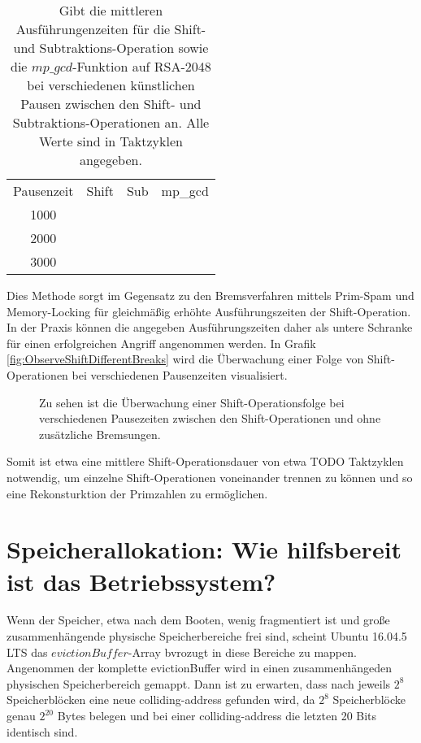 \begin{table}[h]
\caption{Gibt die mittleren Ausführungenzeiten für die Shift- und Subtraktions-Operation sowie die $mp\_gcd$-Funktion auf RSA-2048 bei verschiedenen künstlichen Pausen zwischen den Shift- und Subtraktions-Operationen an. Alle Werte sind in Taktzyklen angegeben.}
\label{tbl:ArtificialBreaksMeanExecutionTime}
\begin{tabular}{cccc}
Pausenzeit & Shift & Sub & mp\_gcd \\
1000       &       &     &         \\
2000       &       &     &         \\
3000       &       &     &        
\end{tabular}
\end{table}

Dies Methode sorgt im Gegensatz zu den Bremsverfahren mittels Prim-Spam und Memory-Locking für gleichmäßig erhöhte Ausführungszeiten der Shift-Operation.
In der Praxis können die angegeben Ausführungszeiten daher als untere Schranke für einen erfolgreichen Angriff angenommen werden.
In Grafik \ref{fig:ObserveShiftDifferentBreaks} wird die Überwachung einer Folge von Shift-Operationen bei verschiedenen Pausenzeiten visualisiert.

\label{fig:ObserveShiftDifferentBreaks}
\begin{figure}[h]
\centering
\begin{scaletikzpicturetowidth}{\textwidth}
%
\end{scaletikzpicturetowidth}
\caption{Zu sehen ist die Überwachung einer Shift-Operationsfolge bei verschiedenen Pausezeiten zwischen den Shift-Operationen und ohne zusätzliche Bremsungen.}
\end{figure}

Somit ist etwa eine mittlere Shift-Operationsdauer von etwa TODO Taktzyklen notwendig, um einzelne Shift-Operationen voneinander trennen zu können und so eine Rekonsturktion der Primzahlen zu ermöglichen.


\section{Speicherallokation: Wie hilfsbereit ist das Betriebssystem?}

Wenn der Speicher, etwa nach dem Booten, wenig fragmentiert ist und große zusammenhängende physische Speicherbereiche frei sind, scheint Ubuntu 16.04.5 LTS das $evictionBuffer$-Array bvrozugt in diese Bereiche zu mappen.
Angenommen der komplette evictionBuffer wird in einen zusammenhängeden physischen Speicherbereich gemappt. Dann ist zu erwarten, dass nach jeweils $2^8$ Speicherblöcken eine neue colliding-address gefunden wird, da $2^8$ Speicherblöcke genau $2^{20}$ Bytes belegen und bei einer colliding-address die letzten 20 Bits identisch sind.

